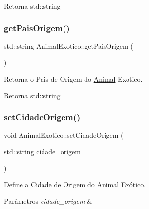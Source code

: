 \begin{DoxyReturn}{Retorna}
std\+::string 
\end{DoxyReturn}
\mbox{\label{classAnimalExotico_a656238e3c9891fb2f596fe2d022e1abf}} 
\subsubsection{\texorpdfstring{get\+Pais\+Origem()}{getPaisOrigem()}}
{\footnotesize\ttfamily std\+::string Animal\+Exotico\+::get\+Pais\+Origem (\begin{DoxyParamCaption}{ }\end{DoxyParamCaption})}



Retorna o Pais de Origem do \hyperlink{classAnimal}{Animal} Exótico. 

\begin{DoxyReturn}{Retorna}
std\+::string 
\end{DoxyReturn}
\mbox{\label{classAnimalExotico_abee9fb2e0bfd567a8a0fcb302cf944db}} 
\subsubsection{\texorpdfstring{set\+Cidade\+Origem()}{setCidadeOrigem()}}
{\footnotesize\ttfamily void Animal\+Exotico\+::set\+Cidade\+Origem (\begin{DoxyParamCaption}\item[{std\+::string}]{cidade\+\_\+origem }\end{DoxyParamCaption})}



Define a Cidade de Origem do \hyperlink{classAnimal}{Animal} Exótico. 


\begin{DoxyParams}{Parâmetros}
{\em cidade\+\_\+origem} & \\
\hline
\end{DoxyParams}
\mbox{\label{classAnimalExotico_a2077371fdd8e779a42451a9183d14c63}} 
